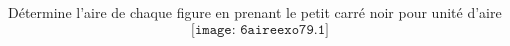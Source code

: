 Détermine l'aire de chaque figure en prenant le petit carré noir
pour unité d'aire 
\[\texttt{[image: 6aireexo79.1]}\] 